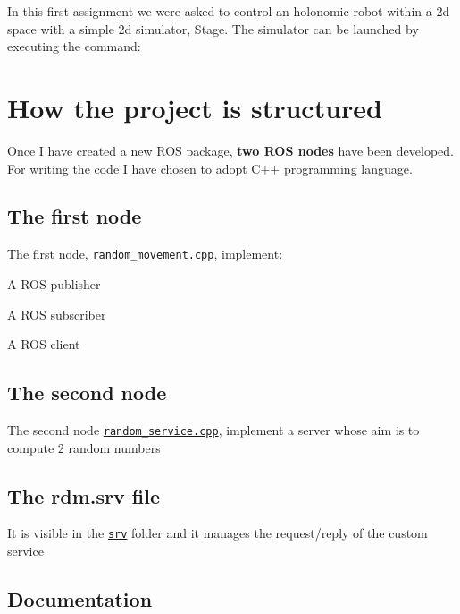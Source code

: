 In this first assignment we were asked to control an holonomic robot within a 2d space with a simple 2d simulator, Stage. The simulator can be launched by executing the command\+:




\section*{How the project is structured}

Once I have created a new R\+OS package, {\bfseries two R\+OS nodes} have been developed. For writing the code I have chosen to adopt C++ programming language.

\subsection*{The first node}

The first node, \href{https://github.com/fedehub/myfirstassignment/blob/main/src/random_movement.cpp}{\tt random\+\_\+movement.\+cpp}, implement\+:


\begin{DoxyEnumerate}
\item A R\+OS publisher
\item A R\+OS subscriber
\item A R\+OS client
\end{DoxyEnumerate}

\subsection*{The second node}

The second node \href{https://github.com/fedehub/myfirstassignment/blob/main/src/random_service.cpp}{\tt random\+\_\+service.\+cpp}, implement a server whose aim is to compute 2 random numbers

\subsection*{The rdm.\+srv file}

It is visible in the \href{https://github.com/fedehub/myfirstassignment/blob/main/srv/}{\tt srv} folder and it manages the request/reply of the custom service

\subsection*{Documentation}

